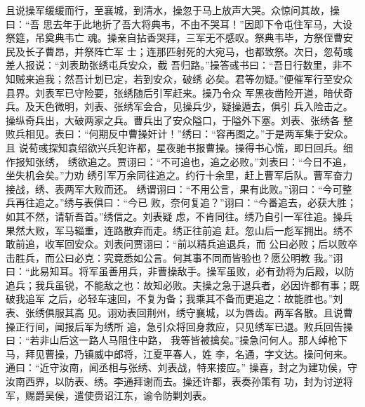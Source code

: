 且说操军缓缓而行，至襄城，到清水，操忽于马上放声大哭。众惊问其故，操曰：“吾
思去年于此地折了吾大将典韦，不由不哭耳！”因即下令屯住军马，大设祭筵，吊奠典韦亡
魂。操亲自拈香哭拜，三军无不感叹。祭典韦毕，方祭侄曹安民及长子曹昂，并祭阵亡军
士；连那匹射死的大宛马，也都致祭。次日，忽荀彧差人报说：“刘表助张绣屯兵安众，截
吾归路。”操答彧书曰：“吾日行数里，非不知贼来追我；然吾计划已定，若到安众，破绣
必矣。君等勿疑。”便催军行至安众县界。刘表军已守险要，张绣随后引军赶来。操乃令众
军黑夜凿险开道，暗伏奇兵。及天色微明，刘表、张绣军会合，见操兵少，疑操遁去，俱引
兵入险击之。操纵奇兵出，大破两家之兵。曹兵出了安众隘口，于隘外下塞。刘表、张绣各
整败兵相见。表曰：“何期反中曹操奸计！”绣曰：“容再图之。”于是两军集于安众。且
说荀彧探知袁绍欲兴兵犯许都，星夜驰书报曹操。操得书心慌，即日回兵。细作报知张绣，
绣欲追之。贾诩曰：“不可追也，追之必败。”刘表曰：“今日不追，坐失机会矣。”力劝
绣引军万余同往追之。约行十余里，赶上曹军后队。曹军奋力接战，绣、表两军大败而还。
绣谓诩曰：“不用公言，果有此败。”诩曰：“今可整兵再往追之。”绣与表俱曰：“今已
败，奈何复追？”诩曰：“今番追去，必获大胜；如其不然，请斩吾首。”绣信之。刘表疑
虑，不肯同往。绣乃自引一军往追。操兵果然大败，军马辎重，连路散弃而走。绣正往前追
赶。忽山后一彪军拥出。绣不敢前追，收军回安众。刘表问贾诩曰：“前以精兵追退兵，而
公曰必败；后以败卒击胜兵，而公曰必克：究竟悉如公言。何其事不同而皆验也？愿公明教
我。”诩曰：“此易知耳。将军虽善用兵，非曹操敌手。操军虽败，必有劲将为后殿，以防
追兵；我兵虽锐，不能敌之也：故知必败。夫操之急于退兵者，必因许都有事；既破我追军
之后，必轻车速回，不复为备；我乘其不备而更追之：故能胜也。”刘表、张绣俱服其高
见。诩劝表回荆州，绣守襄城，以为唇齿。两军各散。且说曹操正行间，闻报后军为绣所
追，急引众将回身救应，只见绣军已退。败兵回告操曰：“若非山后这一路人马阻住中路，
我等皆被擒矣。”操急问何人。那人绰枪下马，拜见曹操，乃镇威中郎将，江夏平春人，姓
李，名通，字文达。操问何来。通曰：“近守汝南，闻丞相与张绣、刘表战，特来接应。”
操喜，封之为建功侯，守汝南西界，以防表、绣。李通拜谢而去。操还许都，表奏孙策有
功，封为讨逆将军，赐爵吴侯，遣使赍诏江东，谕令防剿刘表。

